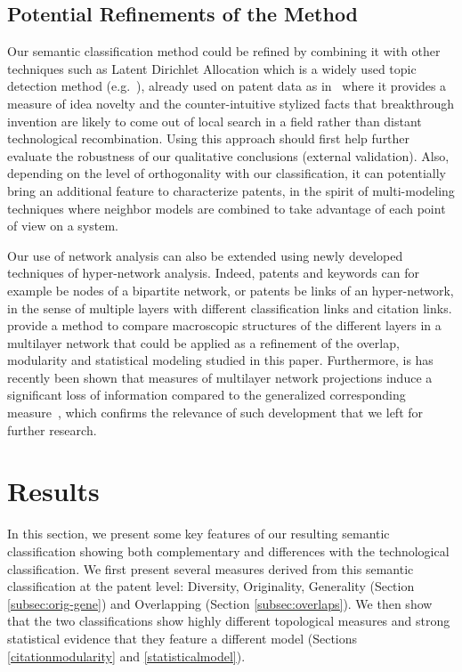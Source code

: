 \documentclass[10pt,A4,draft]{article}
\begin{document}
\subsection{Potential Refinements of the Method}

Our semantic classification method could be refined by combining it with other techniques such as Latent Dirichlet Allocation which is a widely used topic detection method (e.g.~\cite{blei2003latent}), already used on patent data as in~\cite{kaplan2015double} where it provides a measure of idea novelty and the counter-intuitive stylized facts that breakthrough invention are likely to come out of local search in a field rather than distant technological recombination. Using this approach should first help further evaluate the robustness of our qualitative conclusions (external validation). Also, depending on the level of orthogonality with our classification, it can potentially bring an additional feature to characterize patents, in the spirit of multi-modeling techniques where neighbor models are combined to take advantage of each point of view on a system.

Our use of network analysis can also be extended using newly developed techniques of hyper-network analysis. Indeed, patents and keywords can for example be nodes of a bipartite network, or patents be links of an hyper-network, in the sense of multiple layers with different classification links and citation links. \cite{iacovacci2015mesoscopic} provide a method to compare macroscopic structures of the different layers in a multilayer network that could be applied as a refinement of the overlap, modularity and statistical modeling studied in this paper. Furthermore, is has recently been shown that measures of multilayer network projections   induce a significant loss of information compared to the generalized corresponding measure~\cite{de2015ranking}, which confirms the relevance of such development that we left for further research.


\section{Results \label{result}}

In this section, we present some key features of our resulting semantic classification showing both complementary and differences with the technological classification. We first present several measures derived from this semantic classification at the patent level: Diversity, Originality, Generality (Section \ref{subsec:orig-gene}) and Overlapping (Section \ref{subsec:overlaps}). We then show that the two classifications show highly
different topological measures and strong statistical evidence that they feature a different model (Sections \ref{citationmodularity} and \ref{statisticalmodel}).
\end{document}
